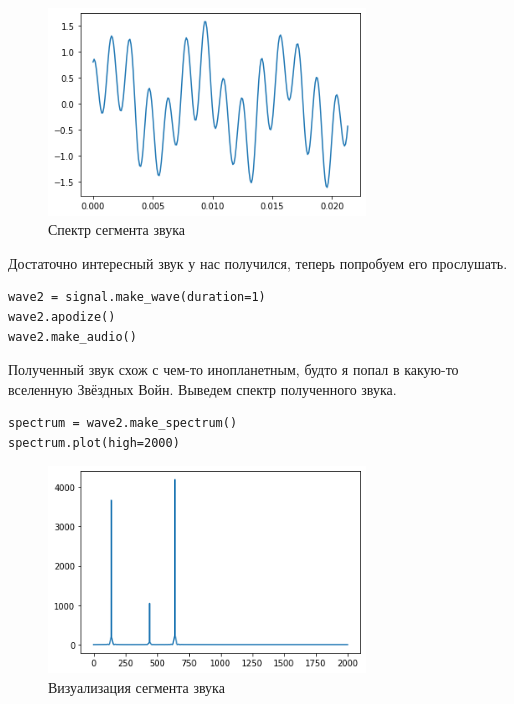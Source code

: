 \documentclass[a4paper,12pt]{report}
\begin{document}
\begin{figure}[H]
        \centering
        \includegraphics[width=0.75\textwidth]{lab1_fig3_1.png}
        \caption{Спектр сегмента звука}
        \label{fig:lab1_fig3_1}
\end{figure}

Достаточно интересный звук у нас получился, теперь попробуем его прослушать.

\begin{lstlisting}[caption=Воспроизведение сложного сигнала]
wave2 = signal.make_wave(duration=1)
wave2.apodize()
wave2.make_audio()
\end{lstlisting}

Полученный звук схож с чем-то инопланетным, будто я попал в какую-то вселенную Звёздных Войн. Выведем спектр полученного звука.

\begin{lstlisting}[caption=Визуализация сложного сигнала]
spectrum = wave2.make_spectrum()
spectrum.plot(high=2000)
\end{lstlisting}

\begin{figure}[H]
        \centering
        \includegraphics[width=0.75\textwidth]{lab1_fig3_2.png}
        \caption{Визуализация сегмента звука}
        \label{fig:lab1_fig3_2}
\end{figure}
\end{document}
